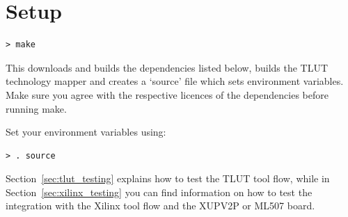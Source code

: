 \documentclass[a4paper,oneside]{memoir}
\begin{document}
\clearpage
\chapter{Setup}\label{sec:setup}
\begin{lstlisting}
> make
\end{lstlisting}
This downloads and builds the dependencies listed below, builds the TLUT technology mapper and creates a `source' file which sets environment variables. 
Make sure you agree with the respective licences of the dependencies before running make. 

Set your environment variables using:
\begin{lstlisting}
> . source
\end{lstlisting}

Section~\ref{sec:tlut_testing} explains how to test the TLUT tool flow, while in Section~\ref{sec:xilinx_testing} you can find information on how to test the integration with the Xilinx tool flow and the XUPV2P or ML507 board.
\end{document}
